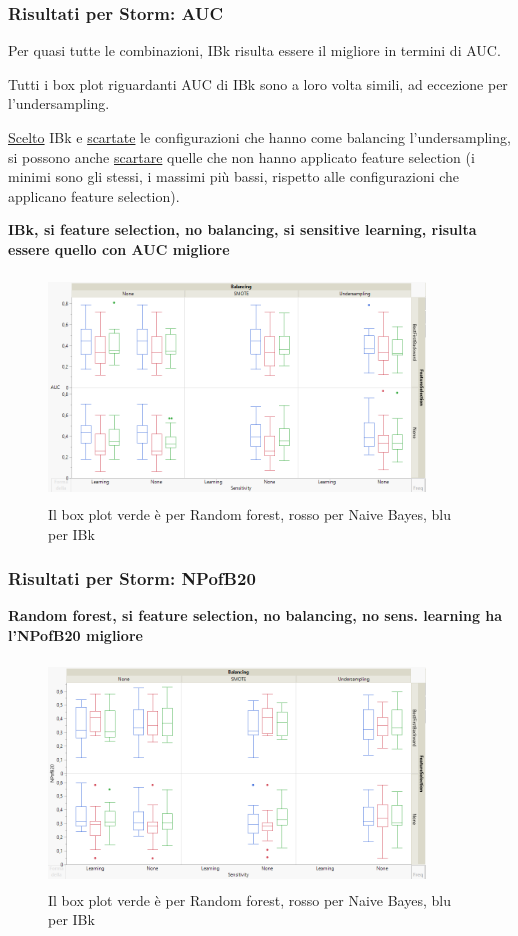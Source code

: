 \documentclass{beamer}
\begin{document}
\begin{frame}
	\frametitle{Risultati per Storm: AUC}
	
	\fontsize{7pt}{8pt}\selectfont
	
	Per quasi tutte le combinazioni, IBk risulta essere il migliore in termini di AUC.
	
	Tutti i box plot riguardanti AUC di IBk sono a loro volta simili, ad eccezione per l'undersampling.
	
	\underline{Scelto} IBk e 
	\underline{scartate} le configurazioni che hanno come balancing l'undersampling, si possono anche
	\underline{scartare} quelle che non hanno applicato feature selection 
	(i minimi sono gli stessi, i massimi più
	bassi, rispetto alle configurazioni che applicano feature selection).
	
	\textbf{IBk, si feature selection, no balancing, si sensitive learning, risulta essere quello con AUC
	migliore}
	
	\centering
	\begin{figure}
	\includegraphics[width=10cm, height=6cm]{storm-auc}
	\caption{Il box plot verde è per Random forest, rosso per Naive Bayes, blu per IBk}
	\end{figure}
\end{frame}

\begin{frame}
	\frametitle{Risultati per Storm: NPofB20}
	
	\fontsize{7pt}{8pt}\selectfont
	
	\textbf{Random forest, si feature selection, no balancing, no sens. learning ha l'NPofB20 migliore}
	
	\centering
	\begin{figure}
	\includegraphics[width=10cm, height=6cm]{storm-npofb20}
	\caption{Il box plot verde è per Random forest, rosso per Naive Bayes, blu per IBk}
	\end{figure}
\end{frame}
\end{document}
